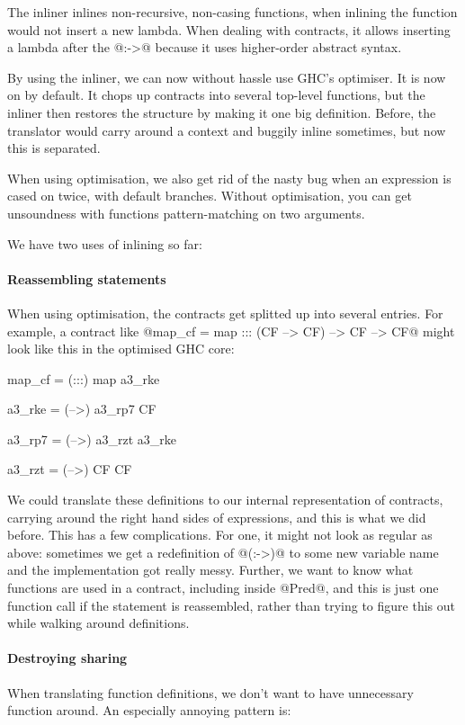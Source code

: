 
The inliner inlines non-recursive, non-casing functions, when inlining
the function would not insert a new lambda.  When dealing with
contracts, it allows inserting a lambda after the @:->@ because it uses
higher-order abstract syntax.

By using the inliner, we can now without hassle use GHC's
optimiser. It is now on by default. It chops up contracts into several
top-level functions, but the inliner then restores the structure by
making it one big definition. Before, the translator would carry
around a context and buggily inline sometimes, but now this is
separated.

When using optimisation, we also get rid of the nasty bug when an expression
is cased on twice, with default branches. Without optimisation, you can get
unsoundness with functions pattern-matching on two arguments.

We have two uses of inlining so far:

\paragraph{Reassembling statements} When using optimisation, the
contracts get splitted up into several entries. For example,
a contract like @map_cf = map ::: (CF --> CF) --> CF --> CF@
might look like this in the optimised GHC core:

\begin{code}
map_cf = (:::) map a3_rke

a3_rke = (-->) a3_rp7 CF

a3_rp7 = (-->) a3_rzt a3_rke

a3_rzt = (-->) CF CF
\end{code}

We could translate these definitions to our internal representation of
contracts, carrying around the right hand sides of expressions, and
this is what we did before. This has a few complications. For one,
it might not look as regular as above: sometimes we get a redefinition
of @(:->)@ to some new variable name and the implementation got really
messy. Further, we want to know what functions are used in a contract,
including inside @Pred@, and this is just one function call if the
statement is reassembled, rather than trying to figure this out while
walking around definitions.

\paragraph{Destroying sharing}
When translating function definitions, we don't want to have
unnecessary function around. An especially annoying pattern is:


